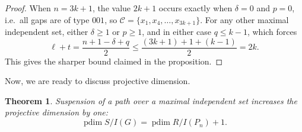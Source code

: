 \documentclass[12pt]{amsart}
\theoremstyle{plain}
\newtheorem{thm}{Theorem}[section]
\theoremstyle{definition}
\DeclareMathOperator{\pdim}{pdim}
\begin{document}
\begin{proof}
When $n=3k+1$, the value $2k+1$ occurs exactly when $\delta=0$ and $p=0$, i.e.\ all gaps are of type
$001$, so $ \mathcal{C}=\{x_1,x_4,\dots,x_{3k+1}\}$. For any other maximal independent set, either $\delta\ge 1$ or
$p\ge 1$, and in either case $q\le k-1$, which forces
\[
\ell+t=\frac{n+1-\delta+q}{2}\le \frac{(3k+1)+1+(k-1)}{2}=2k.
\]
This gives the sharper bound claimed in the proposition.
\end{proof}


Now, we are ready to discuss projective dimension.

\begin{thm}\label{thm:path_pdim}
Suspension of a path over a maximal independent set increases the projective dimension by one:
$$\pdim S/ I(G)= \pdim R/I(P_n) +1.$$
\end{thm}
\end{document}

